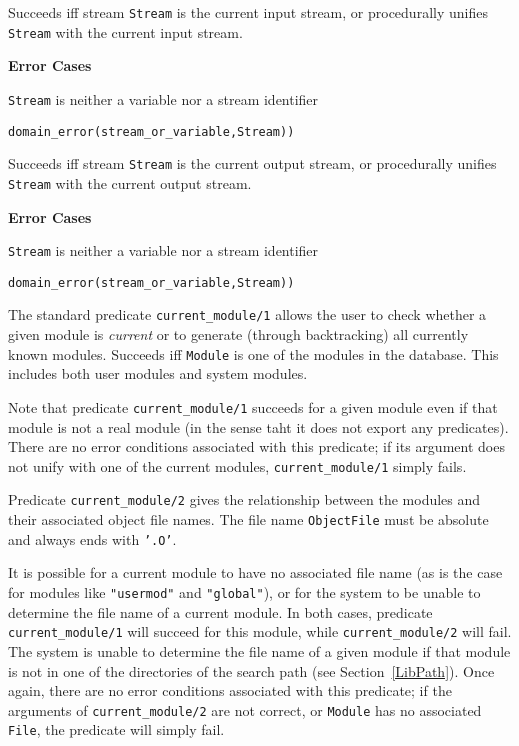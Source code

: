 \begin{description}

    Succeeds iff stream {\tt Stream} is the current input stream, or 
    procedurally unifies {\tt Stream} with the current input stream.

{\bf Error Cases}
\bi
\item 	{\tt Stream} is neither a variable nor a stream identifier
\bi
\item 	{\tt domain\_error(stream\_or\_variable,Stream))}
\ei
\ei

    Succeeds iff stream {\tt Stream} is the current output stream, or 
    procedurally unifies {\tt Stream} with the current output stream.

{\bf Error Cases}
\bi
\item 	{\tt Stream} is neither a variable nor a stream identifier
\bi
\item 	{\tt domain\_error(stream\_or\_variable,Stream))}
\ei
\ei

    The standard predicate {\tt current\_module/1} allows the user to check 
    whether a given module is {\em current} or to generate (through 
    backtracking) all currently known modules.
    Succeeds iff {\tt Module} is one of the modules in the database. This
    includes both user modules and system modules.  

    Note that predicate {\tt current\_module/1} succeeds for a given module 
    even if that module is not a real module (in the sense taht it does not
    export any predicates). There are no error conditions associated 
    with this predicate; if its argument does not unify with one of the 
    current modules, {\tt current\_module/1} simply fails.

    Predicate {\tt current\_module/2} gives the relationship between the
    modules and their associated object file names. The file name 
    {\tt ObjectFile} must be absolute and always ends with {\tt '.O'}.

    It is possible for a current module to have no associated file name 
    (as is the case for modules like {\tt "usermod"} and {\tt "global"}), 
    or for the system to be unable to determine the file name of a current
    module. In both cases, predicate {\tt current\_module/1} will succeed
    for this module, while {\tt current\_module/2} will fail. The system is
    unable to determine the file name of a given module if that module is not
    in one of the directories of the search path (see Section~\ref{LibPath}).
    Once again, there are no error conditions associated with this predicate;
    if the arguments of {\tt current\_module/2} are not correct, or 
    {\tt Module} has no associated {\tt File}, the predicate will simply fail.


\end{description}
